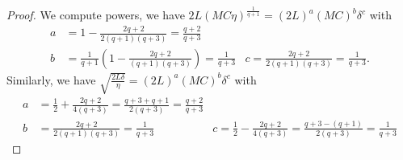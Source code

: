 \documentclass[10pt,a4paper]{amsart}
\begin{document}
\begin{proof}
	We compute powers, we have $2 L( M C\eta)^{\frac{1}{q+1}} = (2L)^{a} (MC)^b \delta^c$ with
	\begin{align*}
		a &= 1 -  \frac{2q+2}{2(q+1)(q+3)}= \frac{q+2}{q+3}  \\
		b &= \frac{1}{q+1}\left( 1 - \frac{2q+2}{(q+1)(q+3)} \right) = \frac{1}{q+3} & c = \frac{2q +2 }{2 (q+1) (q+3)} = \frac{1}{q+3}.
	\end{align*}
	Similarly, we have $\sqrt{\frac{2L\delta}{\eta}} = (2L)^{a} (MC)^b \delta^c$ with
	\begin{align*}
		a &= \frac{1}{2} + \frac{2q+2}{4(q+3)} = \frac{q+3 + q+1 }{2(q+3)} = \frac{q+2}{q+3} \\
		b &= \frac{2q+2}{2(q+1)(q+3)} = \frac{1}{q+3}  
		&c = \frac{1}{2} - \frac{2q+2}{4(q+3)} = \frac{q+3 - (q+1)}{2(q+3)} = \frac{1}{q+3} 
	\end{align*}
\end{proof}
\end{document}
